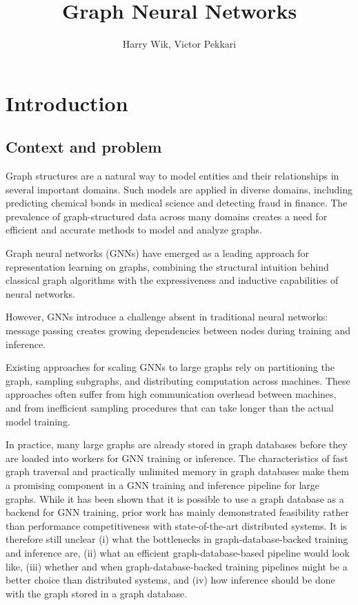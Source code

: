 \documentclass[PhD]{uclathes}
\title{Graph Neural Networks}
\author{Harry Wik, Victor Pekkari}
\begin{document}
\makeintropages

\chapter{Introduction}

\section{Context and problem}
Graph structures are a natural way to model entities and their relationships in
several important domains. Such models are applied in diverse domains, including
predicting chemical bonds in medical science and detecting fraud in finance. The
prevalence of graph-structured data across many domains creates a need for
efficient and accurate methods to model and analyze graphs.

Graph neural networks (GNNs) have emerged as a leading approach for
representation learning on graphs, combining the structural intuition behind
classical graph algorithms with the expressiveness and inductive capabilities of
neural networks.

However, GNNs introduce a challenge absent in traditional neural networks:
message passing creates growing dependencies between nodes during training and
inference.

Existing approaches for scaling GNNs to large graphs rely on partitioning the
graph, sampling subgraphs, and distributing computation across machines. These
approaches often suffer from high communication overhead between machines, and
from inefficient sampling procedures that can take longer than the actual model
training.

In practice, many large graphs are already stored in graph databases before they
are loaded into workers for GNN training or inference. The characteristics of
fast graph traversal and practically unlimited memory in graph databases make
them a promising component in a GNN training and inference pipeline for large
graphs. While it has been shown that it is possible to use a graph database as a
backend for GNN training, prior work has mainly demonstrated feasibility rather
than performance competitiveness with state-of-the-art distributed systems. It
is therefore still unclear (i) what the bottlenecks in graph-database-backed
training and inference are, (ii) what an efficient graph-database-based pipeline
would look like, (iii) whether and when graph-database-backed training
pipelines might be a better choice than distributed systems, and (iv) how
inference should be done with the graph stored in a graph database.
\end{document}
